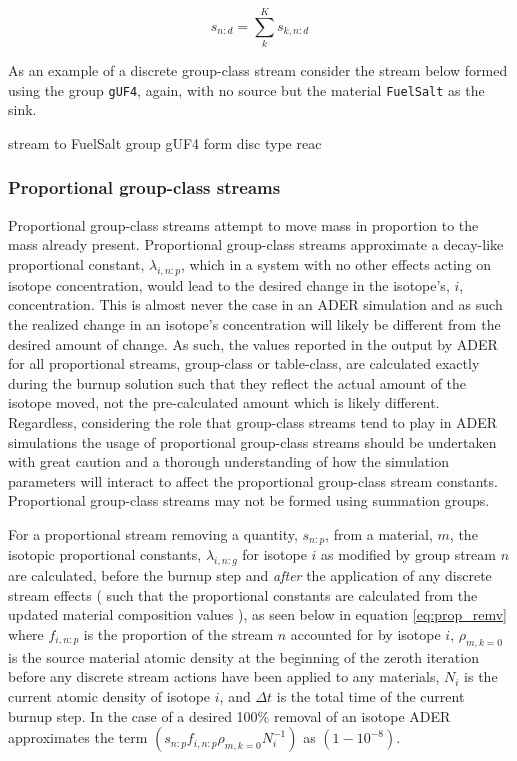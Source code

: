 \begin{equation}\label{eq:disc_s}
s_{n:d} = \sum_{k}^{K} s_{k,n:d}
\end{equation}

As an example of a discrete group-class stream consider the stream below
formed using the group \texttt{gUF4}, again, with no source but the material
\texttt{FuelSalt} as the sink.

\begin{li}
stream to FuelSalt group gUF4 form disc type reac
\end{li}

\subsubsection{Proportional group-class streams}\label{sssec:pgroup}
Proportional group-class streams attempt to move mass in proportion to the mass
already present. Proportional group-class streams approximate a decay-like
proportional constant, $\lambda_{i,n:p}$, which in a system with no other
effects acting on isotope concentration, would lead to the desired change
in the isotope's, $i$, concentration. 
This is almost never the case in an ADER
simulation and as such the realized change in an isotope's concentration will
likely be different from the desired amount of change. As such, the values
reported in the output by ADER for all proportional streams, group-class or
table-class, are calculated exactly during the burnup solution such that they
reflect the actual amount of the isotope moved, not the pre-calculated amount
which is likely different. Regardless, considering the role that group-class
streams tend to play in ADER simulations the usage of proportional group-class
streams should be undertaken with great caution and a thorough understanding
of how the simulation parameters will interact to affect the proportional
group-class stream constants. Proportional group-class streams may not be
formed using summation groups.

For a proportional stream removing a quantity, $s_{n:p}$, from a material, $m$,
the isotopic proportional constants, $\lambda_{i,n:g}$ for isotope $i$ as
modified by group stream $n$ are calculated, before the burnup step
and \textit{after} the application of any discrete stream effects ( such that
the proportional constants are calculated from the updated material composition
values ), as seen below in equation \ref{eq:prop_remv} where
$f_{i,n:p}$ is the proportion of the stream $n$ accounted for by isotope
$i$, $\rho_{m,k=0}$ is the source material atomic density at the beginning
of the zeroth iteration before any discrete stream actions have been applied to
any materials, $N_{i}$ is the current atomic density of isotope $i$, and
$\Delta t$ is the total time of the current burnup step. In the case of a
desired 100\% removal of an isotope ADER approximates the term
$(s_{n:p} f_{i,n:p} \rho_{m,k=0} N_{i}^{-1})$ as $(1 - 10^{-8})$.

